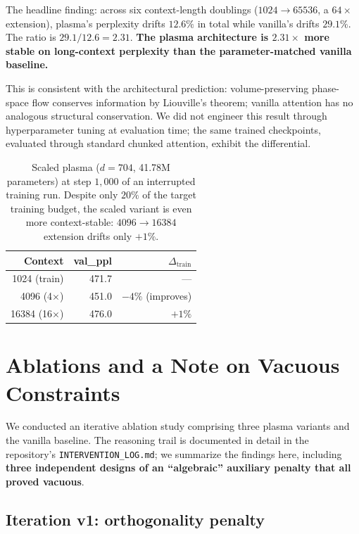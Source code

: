 \documentclass[11pt]{article}
\begin{document}
The headline finding: across six context-length doublings ($1024 \to 65536$,
a $64\times$ extension), plasma's perplexity drifts $12.6\%$ in total while
vanilla's drifts $29.1\%$. The ratio is $29.1 / 12.6 = 2.31$. \textbf{The
plasma architecture is $2.31\times$ more stable on long-context perplexity
than the parameter-matched vanilla baseline.}

This is consistent with the architectural prediction: volume-preserving
phase-space flow conserves information by Liouville's theorem; vanilla
attention has no analogous structural conservation. We did not engineer
this result through hyperparameter tuning at evaluation time; the same
trained checkpoints, evaluated through standard chunked attention, exhibit
the differential.

\begin{table}[h]
\centering
\caption{Scaled plasma ($d = 704$, 41.78M parameters) at step $1{,}000$
of an interrupted training run. Despite only $20\%$ of the target training
budget, the scaled variant is even more context-stable: $4096 \to 16384$
extension drifts only $+1\%$.}
\label{tab:scaled-long-ctx}
\begin{tabular}{rrr}
\toprule
Context & val\_ppl & $\Delta_{\text{train}}$ \\
\midrule
1024 (train) & 471.7 & --- \\
4096 (4$\times$) & 451.0 & $-4\%$ (improves) \\
16384 (16$\times$) & 476.0 & $+1\%$ \\
\bottomrule
\end{tabular}
\end{table}

\section{Ablations and a Note on Vacuous Constraints}
\label{sec:ablations}

We conducted an iterative ablation study comprising three plasma variants
and the vanilla baseline. The reasoning trail is documented in detail
in the repository's \texttt{INTERVENTION\_LOG.md}; we summarize the
findings here, including \textbf{three independent designs of an
``algebraic'' auxiliary penalty that all proved vacuous}.

\subsection{Iteration v1: orthogonality penalty}
\end{document}
